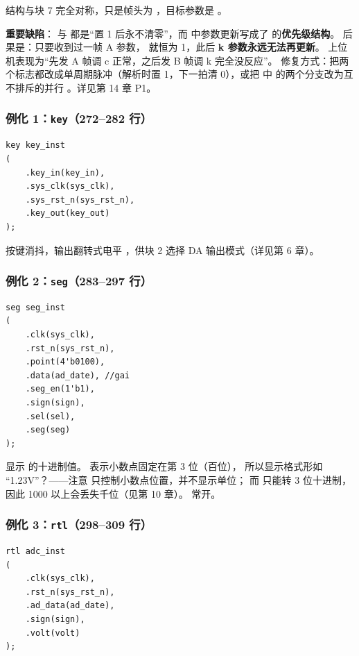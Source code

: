 结构与块 7 完全对称，只是帧头为 ，目标参数是 。

\begin{warnbox}
\textbf{重要缺陷}： 与  都是“置 1 后永不清零”，而
 中参数更新写成了
\mbox{} 的\textbf{优先级结构}。
后果是：只要收到过一帧 A 参数， 就恒为 1，此后 \textbf{k 参数永远无法再更新}。
上位机表现为“先发 A 帧调 c 正常，之后发 B 帧调 k 完全没反应”。
修复方式：把两个标志都改成单周期脉冲（解析时置 1，下一拍清 0），或把  中
的两个分支改为互不排斥的并行 。详见第 14 章 P1。
\end{warnbox}

\subsubsection{例化 1：\texttt{key}（272--282 行）}

\begin{lstlisting}[style=vsnip]
key key_inst
(
    .key_in(key_in),
    .sys_clk(sys_clk),
    .sys_rst_n(sys_rst_n),
    .key_out(key_out)
);
\end{lstlisting}

按键消抖，输出翻转式电平 ，供块 2 选择 DA 输出模式（详见第 6 章）。

\subsubsection{例化 2：\texttt{seg}（283--297 行）}

\begin{lstlisting}[style=vsnip]
seg seg_inst
(
    .clk(sys_clk),
    .rst_n(sys_rst_n),
    .point(4'b0100),
    .data(ad_date), //gai
    .seg_en(1'b1),
    .sign(sign),
    .sel(sel),
    .seg(seg)
);
\end{lstlisting}

显示  的十进制值。 表示小数点固定在第 3 位（百位），
所以显示格式形如 “1.23V”？——注意  只控制小数点位置，并不显示单位；
而  只能转 3 位十进制，因此 1000 以上会丢失千位（见第 10 章）。
 常开。

\subsubsection{例化 3：\texttt{rtl}（298--309 行）}

\begin{lstlisting}[style=vsnip]
rtl adc_inst
(
    .clk(sys_clk),
    .rst_n(sys_rst_n),
    .ad_data(ad_date),
    .sign(sign),
    .volt(volt)
);
\end{lstlisting}

